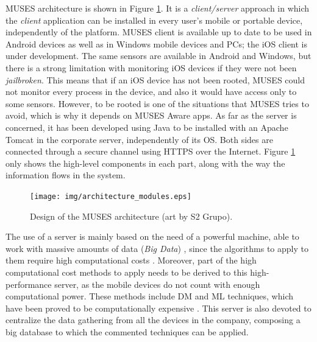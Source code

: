MUSES architecture is shown in Figure \ref{fig:architecture}. %
It is a \textit{client/server} approach in which the \textit{client} application can be installed in every user's mobile or portable device, independently of the platform. MUSES client is available up to date to be used in Android devices as well as in Windows mobile devices and PCs; the iOS client is under development. The same sensors are available in Android and Windows, but there is a strong limitation with monitoring iOS devices if they were not been \textit{jailbroken}. This means that if an iOS device has not been rooted, MUSES could not monitor every process in the device, and also it would have access only to some sensors. However, to be rooted is one of the situations that MUSES tries to avoid, which is why it depends on MUSES Aware apps. %
As far as the server is concerned, it has been developed using Java to be installed with an Apache Tomcat in the corporate server, independently of its OS. %
Both sides are connected through a secure channel using HTTPS over the Internet. Figure \ref{fig:architecture} only shows the high-level components in each part, along with the way the information flows in the system. %

\begin{figure}[ht]
\hspace{-0.7in}
\texttt{[image: img/architecture\_modules.eps]}
\caption{Design of the MUSES architecture (art by S2 Grupo). \label{fig:architecture}}
\end{figure}

The use of a server is mainly based on the need of a powerful machine, able to work with massive amounts of data (\textit{Big Data}) \cite{BigData_11}, since the algorithms to apply to them require high computational costs \cite{Shirkhorshidi14Review}.
Moreover, part of the high computational cost methods to apply needs to be derived to this high-performance server, as the mobile devices do not count with enough computational power. These methods include DM \cite{DataMining_Lee01} and ML \cite{MachineLearning_Bishop06} techniques, which have been proved to be computationally expensive \cite{Cios07DataMining}. This server is also devoted to centralize the data gathering from all the devices in the company, composing a big database to which the commented techniques can be applied.

